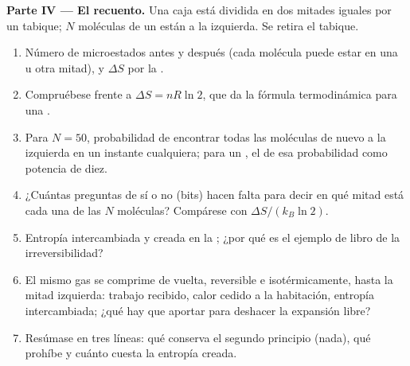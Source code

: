 \begin{problem}
\medskip
\noindent\textbf{Parte IV --- El recuento.}
Una caja está dividida en dos mitades iguales por un tabique; $N$ moléculas
de un  están a la izquierda. Se retira el tabique.
\begin{enumerate}[resume]
  \item Número de microestados antes y después (cada molécula puede estar
        en una u otra mitad), y $\Delta S$ por la .
  \item Compruébese frente a $\Delta S = nR\ln2$, que da la fórmula
        termodinámica para una .
  \item Para $N = 50$, probabilidad de encontrar todas las moléculas de
        nuevo a la izquierda en un instante cualquiera; para un , el
         de esa probabilidad como potencia de diez.
  \item ¿Cuántas preguntas de sí o no (bits) hacen falta para decir en qué
        mitad está cada una de las $N$ moléculas? Compárese con
        $\Delta S/(k_B\ln2)$.
  \item Entropía intercambiada y creada en la ; ¿por qué
        es el ejemplo de libro de la irreversibilidad?
  \item El mismo gas se comprime de vuelta, reversible e isotérmicamente,
        hasta la mitad izquierda: trabajo recibido, calor cedido a la
        habitación, entropía intercambiada; ¿qué hay que aportar para
        deshacer la expansión libre?
  \item Resúmase en tres líneas: qué conserva el segundo principio (nada),
        qué prohíbe y cuánto cuesta la entropía creada.
\end{enumerate}
\end{problem}
